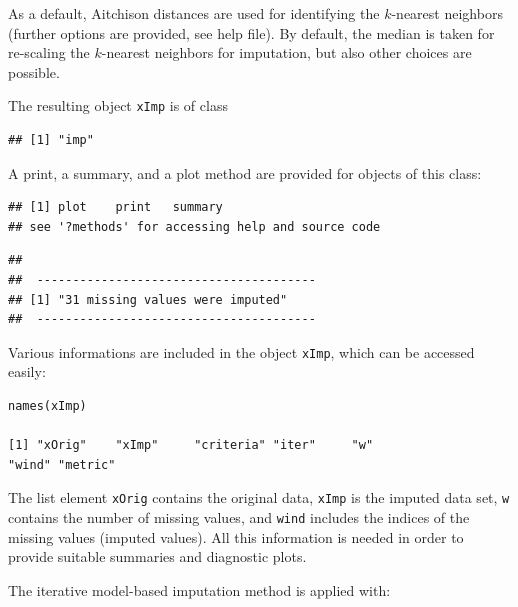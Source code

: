 \documentclass{scrartcl}
\begin{document}
As a default, Aitchison distances are used for identifying the $k$-nearest neighbors
(further options are provided, see help file). By default, the median is
taken for re-scaling the $k$-nearest neighbors for imputation, but also other
choices are possible.

The resulting object \texttt{xImp} is of class
\begin{knitrout}
\color{fgcolor}\begin{kframe}
\begin{alltt}
\end{alltt}
\begin{verbatim}
## [1] "imp"
\end{verbatim}
\end{kframe}
\end{knitrout}

A print, a summary, and a plot method are provided for objects of this class:
\begin{knitrout}
\color{fgcolor}\begin{kframe}
\begin{alltt}
\hlstd{(} \hlstd{=} \hlstd{)}
\end{alltt}
\begin{verbatim}
## [1] plot    print   summary
## see '?methods' for accessing help and source code
\end{verbatim}
\begin{alltt}
\end{alltt}
\begin{verbatim}
## 
##  --------------------------------------- 
## [1] "31 missing values were imputed"
##  ---------------------------------------
\end{verbatim}
\end{kframe}
\end{knitrout}

Various informations are included in the object \texttt{xImp}, which can be accessed easily:

\begin{verbatim}
names(xImp)

[1] "xOrig"    "xImp"     "criteria" "iter"     "w"
"wind" "metric"
\end{verbatim} 

The list element \texttt{xOrig} contains the original data, \texttt{xImp}
is the imputed data set, \texttt{w} contains the number of missing values,
and \texttt{wind} includes the indices of the missing values
(imputed values).
All this information is needed in order to provide suitable summaries and
diagnostic plots.

\medskip
The iterative model-based imputation method is applied with:
\end{document}
